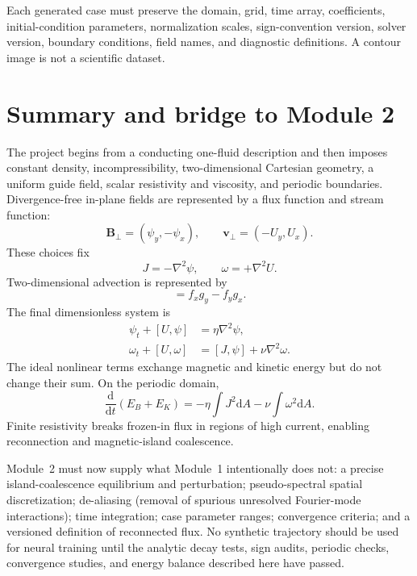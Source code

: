 \documentclass[11pt]{article}
\newcommand{\dd}{\mathrm{d}}
\newcommand{\vect}[1]{\bm{#1}}
\begin{document}
Each generated case must preserve the domain, grid, time array, coefficients, initial-condition parameters, normalization scales, sign-convention version, solver version, boundary conditions, field names, and diagnostic definitions. A contour image is not a scientific dataset.

\section{Summary and bridge to Module 2}
\label{sec:summary}

The project begins from a conducting one-fluid description and then imposes constant density, incompressibility, two-dimensional Cartesian geometry, a uniform guide field, scalar resistivity and viscosity, and periodic boundaries. Divergence-free in-plane fields are represented by a flux function and stream function:
\begin{equation}
\vect{B}_\perp=(\psi_y,-\psi_x),
\qquad
\vect{v}_\perp=(-U_y,U_x).
\end{equation}
These choices fix
\begin{equation}
J=-\nabla^2\psi,
\qquad
\omega=+\nabla^2U.
\end{equation}
Two-dimensional advection is represented by
\begin{equation}
[f,g]=f_xg_y-f_yg_x.
\end{equation}
The final dimensionless system is
\begin{align}
\psi_t+[U,\psi]&=\eta\nabla^2\psi,\\
\omega_t+[U,\omega]&=[J,\psi]+\nu\nabla^2\omega.
\end{align}
The ideal nonlinear terms exchange magnetic and kinetic energy but do not change their sum. On the periodic domain,
\begin{equation}
\frac{\dd}{\dd t}(E_B+E_K)
=-\eta\int J^2\dd A-\nu\int\omega^2\dd A.
\end{equation}
Finite resistivity breaks frozen-in flux in regions of high current, enabling reconnection and magnetic-island coalescence.

Module~2 must now supply what Module~1 intentionally does not: a precise island-coalescence equilibrium and perturbation; pseudo-spectral spatial discretization; de-aliasing (removal of spurious unresolved Fourier-mode interactions); time integration; case parameter ranges; convergence criteria; and a versioned definition of reconnected flux. No synthetic trajectory should be used for neural training until the analytic decay tests, sign audits, periodic checks, convergence studies, and energy balance described here have passed.
\end{document}
